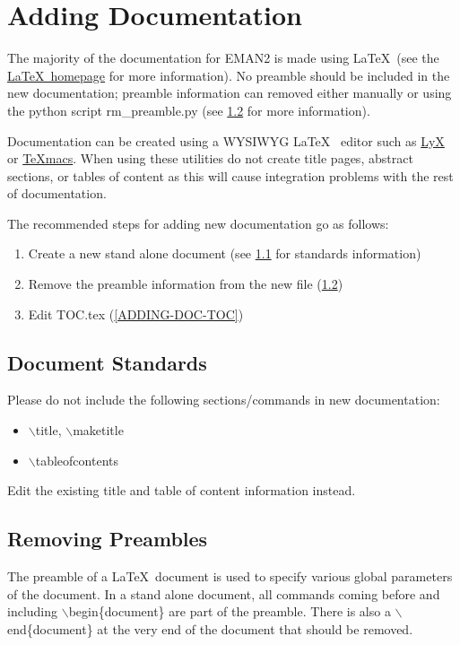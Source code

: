\section{Adding Documentation}

The majority of the documentation for EMAN2 is made using \LaTeX ~(see the
\href{http://www.latex-project.org/}{\LaTeX ~homepage} for more
information).  No preamble should be included in the new
documentation; preamble information can removed either manually or
using the python script rm\_preamble.py (see \ref{ADDING-DOC-RMPRE}
for more information).  

Documentation can be created using a WYSIWYG \LaTeX ~ editor such as
\href{http://www.lyx.org/}{LyX} or
\href{http://www.www.texmacs.org/}{TeXmacs}.  When using these
utilities do not create title pages, abstract sections, or tables of
content as this will cause integration problems with the rest of
documentation.

The recommended steps for adding new documentation go as follows:
\begin{enumerate}
  \item Create a new stand alone document (see \ref{ADDING-DOC-STANDS}
  for standards information)
  \item Remove the preamble information from the new file
  (\ref{ADDING-DOC-RMPRE})
  \item Edit TOC.tex (\ref{ADDING-DOC-TOC})
\end{enumerate}

\subsection{Document Standards} \label{ADDING-DOC-STANDS}
Please do not include the following sections/commands in new documentation:
\begin{itemize}
  \item
    $\backslash$title, $\backslash$maketitle
  \item
    $\backslash$tableofcontents
\end{itemize}
Edit the existing title and table of content information instead.


\subsection{Removing Preambles} \label{ADDING-DOC-RMPRE}

The preamble of a \LaTeX ~document is used to specify various global
parameters of the document.  In a stand alone document, all commands
coming before and including $\backslash$begin\{document\} are part of the
preamble.  There is also a $\backslash$end\{document\} at the very end
of the document that should be removed.

